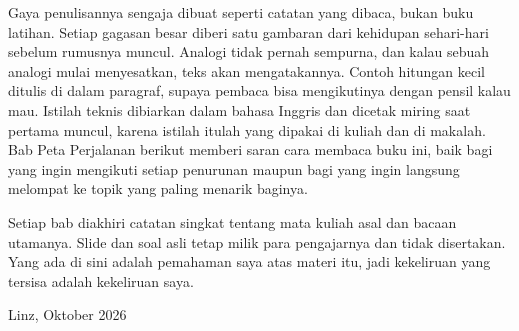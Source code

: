 Gaya penulisannya sengaja dibuat seperti catatan yang dibaca, bukan buku latihan. Setiap
gagasan besar diberi satu gambaran dari kehidupan sehari-hari sebelum rumusnya muncul. Analogi
tidak pernah sempurna, dan kalau sebuah analogi mulai menyesatkan, teks akan mengatakannya.
Contoh hitungan kecil ditulis di dalam paragraf, supaya pembaca bisa mengikutinya dengan
pensil kalau mau. Istilah teknis dibiarkan dalam bahasa Inggris dan dicetak miring saat pertama
muncul, karena istilah itulah yang dipakai di kuliah dan di makalah. Bab Peta Perjalanan berikut
memberi saran cara membaca buku ini, baik bagi yang ingin mengikuti setiap penurunan maupun bagi
yang ingin langsung melompat ke topik yang paling menarik baginya.

Setiap bab diakhiri catatan singkat tentang mata kuliah asal dan bacaan utamanya. Slide dan
soal asli tetap milik para pengajarnya dan tidak disertakan. Yang ada di sini adalah pemahaman
saya atas materi itu, jadi kekeliruan yang tersisa adalah kekeliruan saya.

\bigskip
\hfill Linz, Oktober 2026

